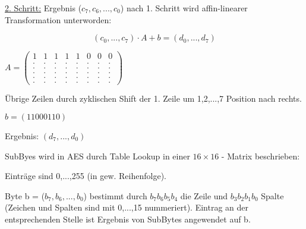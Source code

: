 \underline{2. Schritt:} Ergebnis ($c_7,c_6,...,c_0$) nach 1. Schritt wird affin-linearer Transformation unterworden:

\begin{equation}
  (c_0, ..., c_7) \cdot A + b = (d_0, ..., d_7)
\end{equation}

$A = \begin{pmatrix}1 & 1 & 1 & 1 & 1 & 0 & 0 & 0 \\ . & . & . &. &. &. &.&. \\ . & . & . &. &. &. &.&. \\. & . & . &. &. &. &.&. \\ . & . & . &. &. &. &.&. \\ . & . & . &. &. &. &.&. \end{pmatrix}$ 

Übrige Zeilen durch zyklischen Shift der 1. Zeile um 1,2,...,7 Position nach rechts.

\par \medskip

$b = (11000110)$

Ergebnis: $(d_7, ..., d_0)$

SubByes wird in AES durch Table Lookup in einer $16 \times 16$ - Matrix beschrieben:

Einträge sind 0,...,255 (in gew. Reihenfolge).

Byte b = ($b_7,b_6,...,b_0$) bestimmt durch $b_7b_6b_5b_4$ die Zeile und $b_3b_2b_1b_0$ Spalte (Zeichen und Spalten sind mit 0,...,15 nummeriert). Eintrag an der entsprechenden Stelle ist Ergebnis von SubBytes angewendet auf b.


